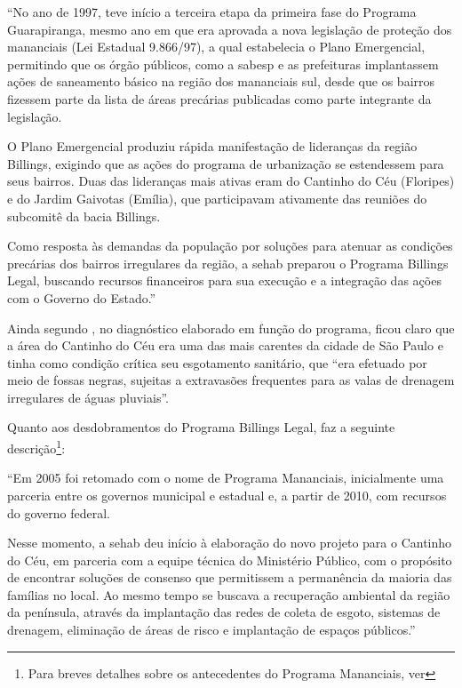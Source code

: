 	\begin{citacao}
		``No ano de 1997, teve início a terceira etapa da primeira fase do Programa Guarapiranga, mesmo ano em que era aprovada a nova legislação de proteção dos mananciais (Lei Estadual 9.866/97), a qual estabelecia o Plano Emergencial, permitindo que os órgão públicos, como a \gls{sabesp} e as prefeituras implantassem ações de saneamento básico na região dos mananciais sul, desde que os bairros fizessem parte da lista de áreas precárias publicadas como parte integrante da legislação.
		
		O Plano Emergencial produziu rápida manifestação de lideranças da região Billings, exigindo que as ações do programa de urbanização se estendessem para seus bairros. Duas das lideranças mais ativas eram do Cantinho do Céu (Floripes) e do Jardim Gaivotas (Emília), que participavam ativamente das reuniões do subcomitê da bacia Billings.
		
		Como resposta às demandas da população por soluções para atenuar as condições precárias dos bairros irregulares da região, a \gls{sehab} preparou o Programa Billings Legal, buscando recursos financeiros para sua execução e a integração das ações com o Governo do Estado.''
	\end{citacao}

	Ainda segundo , no diagnóstico elaborado em função do programa, ficou claro que a área do Cantinho do Céu era uma das mais carentes da cidade de São Paulo e tinha como condição crítica seu esgotamento sanitário, que ``era efetuado por meio de fossas negras, sujeitas a extravasões frequentes para as valas de drenagem irregulares de águas pluviais''.
	
	Quanto aos desdobramentos do Programa Billings Legal,  faz a seguinte descrição\footnote{Para breves detalhes sobre os antecedentes do Programa Mananciais, ver }:
	
	\begin{citacao}
		``Em 2005 foi retomado com o nome de Programa Mananciais, inicialmente uma parceria entre os governos municipal e estadual e, a partir de 2010, com recursos do governo federal.
		
		Nesse momento, a \gls{sehab} deu início à elaboração do novo projeto para o Cantinho do Céu, em parceria com a equipe técnica do Ministério Público, com o propósito de encontrar soluções de consenso que permitissem a permanência da maioria das famílias no local. Ao mesmo tempo se buscava a recuperação ambiental da região da península, através da implantação das redes de coleta de esgoto, sistemas de drenagem, eliminação de áreas de risco e implantação de espaços públicos.''
	\end{citacao}
	

